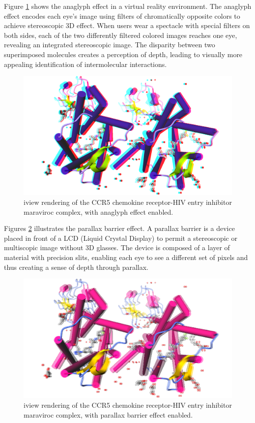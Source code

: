 Figure \ref{fig:anaglyph} shows the anaglyph effect in a virtual reality environment. The anaglyph effect encodes each eye's image using filters of chromatically opposite colors to achieve stereoscopic 3D effect. When users wear a spectacle with special filters on both sides, each of the two differently filtered colored images reaches one eye, revealing an integrated stereoscopic image. The disparity between two superimposed molecules creates a perception of depth, leading to visually more appealing identification of intermolecular interactions.
 
\begin{figure}
\begin{center}
\includegraphics{../iview/anaglyph.png}
\end{center}
\caption{iview rendering of the CCR5 chemokine receptor-HIV entry inhibitor maraviroc complex, with anaglyph effect enabled.}
\label{fig:anaglyph}
\end{figure}

Figures \ref{fig:parallaxbarrier} illustrates the parallax barrier effect. A parallax barrier is a device placed in front of a LCD (Liquid Crystal Display) to permit a stereoscopic or multiscopic image without 3D glasses. The device is composed of a layer of material with precision slits, enabling each eye to see a different set of pixels and thus creating a sense of depth through parallax.

\begin{figure}
\begin{center}
\includegraphics{../iview/parallaxbarrier.png}
\end{center}
\caption{iview rendering of the CCR5 chemokine receptor-HIV entry inhibitor maraviroc complex, with parallax barrier effect enabled.}
\label{fig:parallaxbarrier}
\end{figure}

